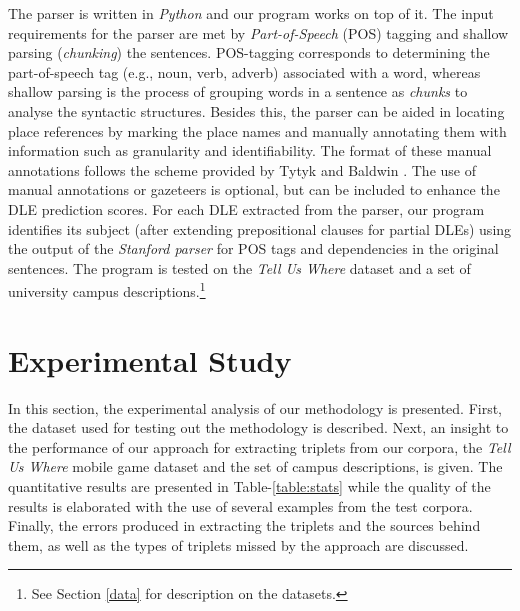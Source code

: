 \documentclass[letter]{sig-alternate}
\begin{document}
The parser is written in \textit{Python} and our program works on top of it. The input requirements for the parser are met by \textit{Part-of-Speech} (POS) tagging and shallow parsing (\textit{chunking}) the sentences. POS-tagging corresponds to determining the part-of-speech tag (e.g., noun, verb, adverb) associated with a word, whereas shallow parsing is the process of grouping words in a sentence as \textit{chunks} to analyse the syntactic structures. Besides this, the parser can be aided in locating place references by marking the place names and manually annotating them with information such as granularity and identifiability. The format of these manual annotations follows the scheme provided by Tytyk and Baldwin \cite{igor:annotations}. The use of manual annotations or gazeteers is optional, but can be included to enhance the DLE prediction scores. For each DLE extracted from the parser, our program identifies its subject (after extending prepositional clauses for partial DLEs) using the output of the \textit{Stanford parser} \cite{klein:accurate} for POS tags and dependencies in the original sentences. The program is tested on the \textit{Tell Us Where} dataset \cite{tuw} and a set of university campus descriptions.\footnote{See Section \ref{data} for description on the datasets.}
\section{Experimental Study}
\label{sec:experimentalstudy}
In this section, the experimental analysis of our methodology is presented. First, the dataset used for testing out the methodology is described. Next, an insight to the performance of our approach for extracting triplets from our corpora, the \textit{Tell Us Where} mobile game dataset and the set of campus descriptions, is given. The quantitative results are presented in Table-\ref{table:stats} while the quality of the results is elaborated with the use of several examples from the test corpora. Finally, the errors produced in extracting the triplets and the sources behind them, as well as the types of triplets missed by the approach are discussed.
\end{document}
